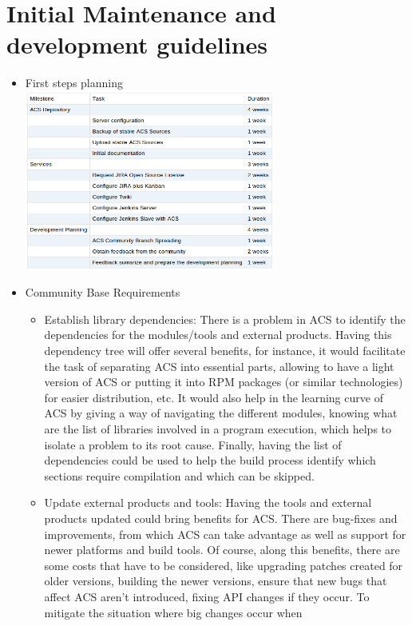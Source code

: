 \section{Initial Maintenance and development guidelines}
\begin{itemize}
	\item First steps planning \\
		\includegraphics[width=0.65\textwidth]{img/planning}	
	\item Community Base Requirements
	\begin{itemize}
		\item Establish library dependencies: There is a problem in ACS to identify the dependencies for the modules/tools and external products. 
			Having this dependency tree will offer several benefits, for instance, it would facilitate the task of separating ACS into essential 
			parts, allowing to have a light version of ACS or putting it into RPM packages (or similar technologies) for easier distribution, etc. 
			It would also help in the learning curve of ACS by giving a way of navigating the different modules, knowing what are the list of 
			libraries involved in a program execution, which helps to isolate a problem to its root cause. Finally, having the list of 
			dependencies could be used to help the build process identify which sections require compilation and which can be skipped.
		\item Update external products and tools: Having the tools and external products updated could bring benefits for ACS. There are bug-fixes and 
			improvements, from which ACS can take advantage as well as support for newer platforms and build tools. Of course, along this benefits, 
			there are some costs that have to be considered, like upgrading patches created for older versions, building the newer versions, ensure 
			that new bugs that affect ACS aren't introduced, fixing API changes if they occur. To mitigate the situation where big changes occur when 

\end{itemize}
\end{itemize}
